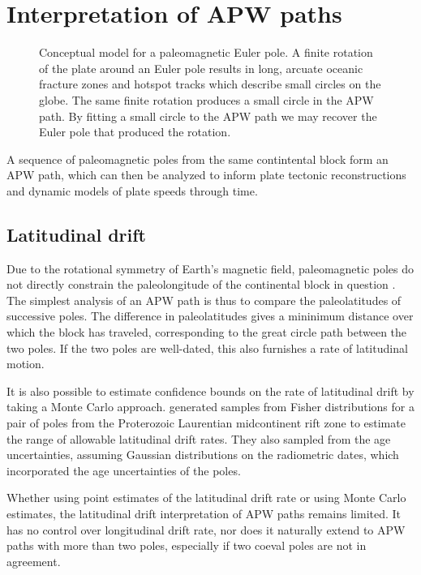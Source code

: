 \documentclass[preprint,12pt,authoryear]{elsarticle}
\begin{document}
\section{Interpretation of APW paths}
\label{sec:apwp}
\begin{figure}
\caption[Conceptual model for a paleomagnetic Euler pole.]{Conceptual model for a paleomagnetic Euler pole. A finite rotation of the plate around an Euler pole results in long, arcuate oceanic fracture zones and hotspot tracks which describe small circles on the globe. The same finite rotation produces a small circle in the APW path. By fitting a small circle to the APW path we may recover the Euler pole that produced the rotation.}
\label{fig:pep}
\end{figure}
A sequence of paleomagnetic poles from the same contintental block form an APW path,
which can then be analyzed to inform plate tectonic reconstructions and dynamic models
of plate speeds through time. 

\subsection{Latitudinal drift}
Due to the rotational symmetry of Earth's magnetic field, paleomagnetic poles do not
directly constrain the paleolongitude of the continental block in question \citep{butler1992paleomagnetism}.
The simplest analysis of an APW path is thus to compare the paleolatitudes of successive poles.
The difference in paleolatitudes gives a mininimum distance over which the block has traveled, 
corresponding to the great circle path between the two poles. If the two poles are well-dated,
this also furnishes a rate of latitudinal motion.

It is also possible to estimate confidence bounds on the rate of latitudinal drift by
taking a Monte Carlo approach. \citet{swanson2015new} generated samples from Fisher distributions
for a pair of poles from the Proterozoic Laurentian midcontinent rift zone to estimate the range
of allowable latitudinal drift rates. They also sampled from the age uncertainties, assuming
Gaussian distributions on the radiometric dates, which incorporated the age uncertainties of the poles.

Whether using point estimates of the latitudinal drift rate or using Monte Carlo estimates, 
the latitudinal drift interpretation of APW paths remains limited.
It has no control over longitudinal drift rate, 
nor does it naturally extend to APW paths with more than two poles, 
especially if two coeval poles are not in agreement.
\end{document}
